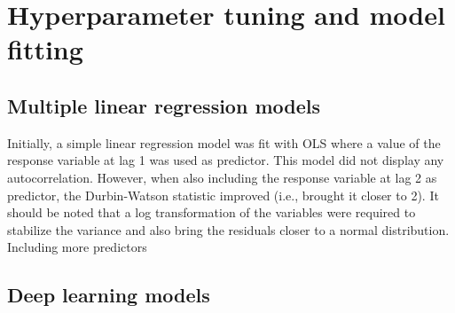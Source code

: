 \section{Hyperparameter tuning and model fitting}
\label{sec:tuning}

\subsection{Multiple linear regression models}
Initially, a simple linear regression model was fit with OLS where a value of the response variable at lag 1 was used as predictor. This model did not display any autocorrelation. However, when also including the response variable at lag 2 as predictor, the Durbin-Watson statistic improved (i.e., brought it closer to 2). It should be noted that a log transformation of the variables were required to stabilize the variance and also bring the residuals closer to a normal distribution. 
Including more predictors 


\subsection{Deep learning models}

